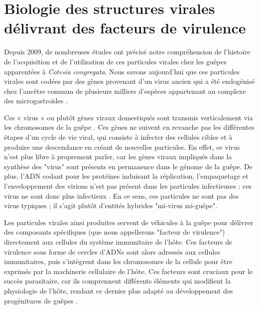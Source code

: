 \section{Biologie des structures virales délivrant des facteurs de virulence}

Depuis 2009, de nombreuses études ont précisé notre compréhension de l'histoire de l'acquisition et de l'utilisation de ces particules virales chez les guêpes apparentées à \textit{Cotesia congregata}. Nous savons aujourd'hui que ces particules virales sont codées par des gènes provenant d'un virus ancien qui a été endogénisé chez l'ancêtre commun de plusieurs milliers d'espèces appartenant au complexe des microgastroïdes \citep{strand_polydnaviruses_2015}. 

Ces « virus » ou plutôt gènes viraux domestiqués sont transmis verticalement via les chromosomes de la guêpe \citep{bezier_polydnaviruses_2009}. Ces gènes ne suivent en revanche pas les différentes étapes d'un cycle de vie viral, qui consiste à infecter des cellules cibles et à produire une descendance en créant de nouvelles particules. En effet, ce virus n'est plus libre à proprement parler, car les gènes viraux impliqués dans la synthèse des "virus" sont présents en permanence dans le génome de la guêpe. De plus, l'ADN codant pour les protéines induisant la réplication, l'empaquetage et l'enveloppement des virions n'est pas présent dans les particules infectieuses : ces virus ne sont donc plus infectieux \citep{strand_polydnaviruses_2015}. En ce sens, ces particules ne sont pas des virus typiques ; il s'agit plutôt d'entités hybrides "mi-virus mi-guêpe". 

Les particules virales ainsi produites servent de véhicules à la guêpe pour délivrer des composants spécifiques (que nous appellerons "facteur de virulence") directement aux cellules du système immunitaire de l'hôte. Ces facteurs de virulence sous forme de cercles d'ADNs sont alors adressés aux cellules immunitaires, puis s'intègrent dans les chromosomes de la cellule pour être exprimés par la machinerie cellulaire de l'hôte. Ces facteurs sont cruciaux pour le succès parasitaire, car ils comprennent différents éléments qui modifient la physiologie de l'hôte, rendant ce dernier plus adapté au développement des progénitures de guêpes \citep{gauthier_recurrent_2018}. 

